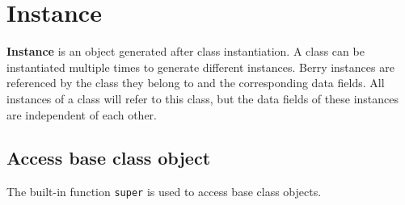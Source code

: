 \section{Instance}

\textbf{Instance} is an object generated after class instantiation. A class can be instantiated multiple times to generate different instances. Berry instances are referenced by the class they belong to and the corresponding data fields. All instances of a class will refer to this class, but the data fields of these instances are independent of each other.

\subsection {Access base class object}

The built-in function \texttt{super} is used to access base class objects.
